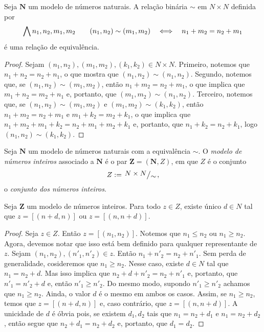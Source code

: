 \begin{proposition}
	Seja $\bm N$ um modelo de números naturais. A relação binária $\sim$ em $N \times N$ definida por
	\begin{equation*}
	\bigwedge\nolimits n_1,n_2,m_1,m_2 \qquad (n_1,n_2) \sim (m_1,m_2) \quad \Longleftrightarrow \quad n_1+m_2=n_2+m_1
	\end{equation*}
é uma relação de equivalência.
\end{proposition}
\begin{proof}
	Sejam $(n_1,n_2), (m_1,m_2),(k_1,k_2) \in N \times N$. Primeiro, notemos que $n_1+n_2=n_2+n_1$, o que mostra que $(n_1,n_2) \sim (n_1,n_2)$. Segundo, notemos que, se $(n_1,n_2) \sim (m_1,m_2)$, então $n_1+m_2=n_2+m_1$, o que implica que $m_1+n_2=m_2+n_1$ e, portanto, que $(m_1,m_2) \sim (n_1,n_2)$. Terceiro, notemos que, se $(n_1,n_2) \sim (m_1,m_2)$ e $(m_1,m_2) \sim (k_1,k_2)$, então $n_1+m_2=n_2+m_1$ e $m_1+k_2=m_2+k_1$, o que implica que $n_1+m_2+m_1+k_2=n_2+m_1+m_2+k_1$ e, portanto, que $n_1+k_2=n_2+k_1$, logo $(n_1,n_2) \sim (k_1,k_2)$.
\end{proof}

\begin{definition}
	Seja $\bm N$ um modelo de números naturais com a equivalência $\sim$. O \emph{modelo de números inteiros} associado a $\bm N$ é o par $\bm Z = (\bm N,Z)$, em que $Z$ é o conjunto 
	\begin{equation*}
	Z := \quo{N \times N}{\sim},
	\end{equation*}
o \emph{conjunto dos números inteiros}.
\end{definition}

\begin{proposition}
	Seja $\bm Z$ um modelo de números inteiros. Para todo $z \in Z$, existe único $d \in N$ tal que $z=[(n+d,n)]$ ou $z=[(n,n+d)]$.
\end{proposition}
\begin{proof}
	Seja $z \in Z$. Então $z=[(n_1,n_2)]$. Notemos que $n_1 \leq n_2$ ou $n_1 \geq n_2$. Agora, devemos notar que isso está bem definido para qualquer representante de $z$. Sejam $(n_1,n_2),(n'_1,n'_2) \in z$. Então $n_1+n'_2=n_2+n'_1$. Sem perda de generalidade, cosideremos que $n_1 \geq n_2$. Nesse caso, existe $d \in N$ tal que $n_1=n_2+d$. Mas isso implica que $n_2+d+n'_2=n_2+n'_1$ e, portanto, que $n'_1=n'_2+d$ e, então $n'_1 \geq n'_2$. Do mesmo modo, supondo $n'_1 \geq n'_2$ achamos que $n_1 \geq n_2$. Ainda, o valor $d$ é o mesmo em ambos os casos. Assim, se $n_1 \geq n_2$, temos que $z=[(n+d,n)]$ e, caso contrário, que $z=[(n,n+d)]$. A unicidade de $d$ é óbvia pois, se existem $d_1,d_2$ tais que $n_1=n_2+d_1$ e $n_1=n_2+d_2$, então segue que $n_2+d_1=n_2+d_2$ e, portanto, que $d_1=d_2$.
\end{proof}

